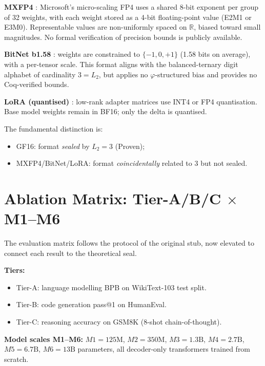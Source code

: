 \textbf{MXFP4} \citep{rouhani2023microscaling}: Microsoft's
micro-scaling FP4 uses a shared 8-bit exponent per group of
32 weights, with each weight stored as a 4-bit floating-point
value (E2M1 or E3M0).  Representable values are
non-uniformly spaced on $\mathbb{R}$, biased toward small
magnitudes.  No formal verification of precision bounds is
publicly available.

\textbf{BitNet b1.58} \citep{ma2024era}: weights are
constrained to $\{-1, 0, +1\}$ (1.58 bits on average), with
a per-tensor scale.  This format aligns with the
balanced-ternary digit alphabet of cardinality $3 = L_2$,
but applies no $\varphi$-structured bias and provides no
Coq-verified bounds.

\textbf{LoRA (quantised)} \citep{hu2022lora}: low-rank
adapter matrices use INT4 or FP4 quantisation.  Base model
weights remain in BF16; only the delta is quantised.

The fundamental distinction is:
\begin{itemize}
  \item GF16: format \emph{sealed} by $L_2 = 3$ (Proven);
  \item MXFP4/BitNet/LoRA: format \emph{coincidentally}
        related to $3$ but not sealed.
\end{itemize}

\section{Ablation Matrix: Tier-A/B/C $\times$ M1--M6}
\label{sec:gs-ablation}

The evaluation matrix follows the protocol of the original
stub, now elevated to connect each result to the
theoretical seal.

\textbf{Tiers:}
\begin{itemize}
  \item Tier-A: language modelling BPB on WikiText-103 test split.
  \item Tier-B: code generation pass@1 on HumanEval.
  \item Tier-C: reasoning accuracy on GSM8K (8-shot chain-of-thought).
\end{itemize}

\textbf{Model scales M1--M6:}
$M1 = 125\text{M}$, $M2 = 350\text{M}$, $M3 = 1.3\text{B}$,
$M4 = 2.7\text{B}$, $M5 = 6.7\text{B}$, $M6 = 13\text{B}$
parameters, all decoder-only transformers trained from scratch.

